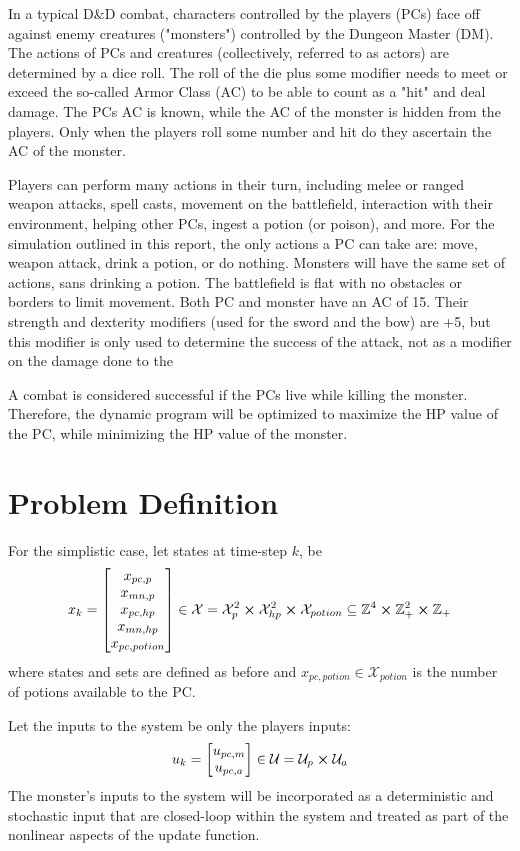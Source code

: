 \documentclass[letterpaper, 10 pt, conference]{ieeeconf}
\newcommand{\Z}{\mathbb{Z}}
\begin{document}
In a typical D\&D combat, characters controlled by the players (PCs) face off against enemy creatures ("monsters") controlled by the Dungeon Master (DM). The actions of PCs and creatures (collectively,
referred to as actors) are determined by a dice roll. The roll of the die plus some modifier needs to meet or exceed the so-called Armor Class (AC) to be able to count as a "hit"
and deal damage. The PCs AC is known, while the AC of the monster is hidden from the players. Only when the players roll some number and hit do they ascertain the AC of the monster.

Players can perform many actions in their turn, including melee or ranged weapon attacks, spell casts, movement on the battlefield, interaction with their environment, helping other
PCs, ingest a potion (or poison), and more. For the simulation outlined in this report, the only actions a PC can take are: move, weapon attack, drink a potion, or do nothing. Monsters 
will have the same set of actions, sans drinking a potion. The battlefield is flat with no obstacles or borders to limit movement. Both PC and monster have an AC of 15. Their strength and dexterity modifiers (used
for the sword and the bow) are +5, but this modifier is only used to determine the success of the attack, not as a modifier on the damage done to the

A combat is considered successful if the PCs live while killing the monster. Therefore, the dynamic program will be optimized to maximize the HP value of the PC, while minimizing the HP
value of the monster. 

\section{Problem Definition}
For the simplistic case, let states at time-step $k$, be \[
    x_k = \mqty[x_{pc,p}\\x_{mn,p}\\x_{pc,hp}\\x_{mn,hp}\\ x_{pc,potion}] 
    \in \mathcal{X} = \mathcal{X}_p^2 \cross \mathcal{X}_{hp}^2 \cross \mathcal{X}_{potion}
    \subseteq \Z^{4} \cross \Z_{+}^{2} \cross \Z_{+}
\] where states and sets are defined as before and $x_{pc,potion} \in \mathcal{X}_{potion}$ is the number of potions available to the PC.

Let the inputs to the system be only the players inputs: \[
    u_k = \mqty[u_{pc,m}\\u_{pc,a}] \in \mathcal{U} = \mathcal{U}_{p} \cross \mathcal{U}_{a} %
\] The monster's inputs to the system will be incorporated as a deterministic and stochastic input that are closed-loop within the system and treated as part of the nonlinear aspects of the update function.
\end{document}
